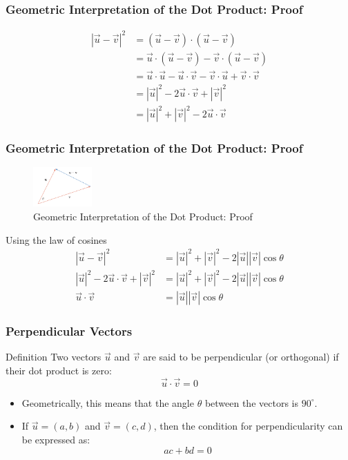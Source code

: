 \documentclass{beamer}
\begin{document}
\begin{frame}
\frametitle{Geometric Interpretation of the Dot Product: Proof}
\begin{align*}
    | \vec{u} - \vec{v}|^2 &= (\vec{u} - \vec{v}) \cdot (\vec{u} - \vec{v}) \\
    &= \vec{u} \cdot (\vec{u} - \vec{v} ) - \vec{v} \cdot (\vec{u} - \vec{v}) \\
    &= \vec{u} \cdot \vec{u} - \vec{u} \cdot \vec{v} - \vec{v} \cdot \vec{u} + \vec{v} \cdot \vec{v} \\
    &= |\vec{u}|^2 - 2\vec{u} \cdot \vec{v} + |\vec{v}|^2 \\
    &= |\vec{u}|^2 + |\vec{v}|^2 - 2\vec{u} \cdot \vec{v}
\end{align*}
\end{frame}

\begin{frame}
    \frametitle{Geometric Interpretation of the Dot Product: Proof}
    \begin{figure}
        \centering
        \includegraphics[width=0.2\textwidth]{vector6.png}
        \caption{Geometric Interpretation of the Dot Product: Proof}
        \label{fig:dot_product_proof}
    \end{figure}
    Using the law of cosines
    \begin{align*}
        |\vec{u} - \vec{v}|^2 &= |\vec{u}|^2 + |\vec{v}|^2 - 2|\vec{u}||\vec{v}|\cos\theta \\
        |\vec{u}|^2 - 2\vec{u} \cdot \vec{v} + |\vec{v}|^2 &= |\vec{u}|^2 + |\vec{v}|^2 - 2|\vec{u}||\vec{v}|\cos\theta \\
        \vec{u} \cdot \vec{v} &= |\vec{u}||\vec{v}|\cos\theta
    \end{align*}
\end{frame}

\begin{frame}
    \frametitle{Perpendicular Vectors}
    \begin{block}{Definition}
        Two vectors \(\vec{u}\) and \(\vec{v}\) are said to be perpendicular (or orthogonal) if their dot product is zero:
        \[
        \vec{u} \cdot \vec{v} = 0
        \]
    \end{block}
    \begin{itemize}
        \item Geometrically, this means that the angle \(\theta\) between the vectors is \(90^\circ\).
        \item If \(\vec{u} = (a, b)\) and \(\vec{v} = (c, d)\), then the condition for perpendicularity can be expressed as:
        \[
        ac + bd = 0
        \]
    \end{itemize}
\end{frame}
\end{document}
